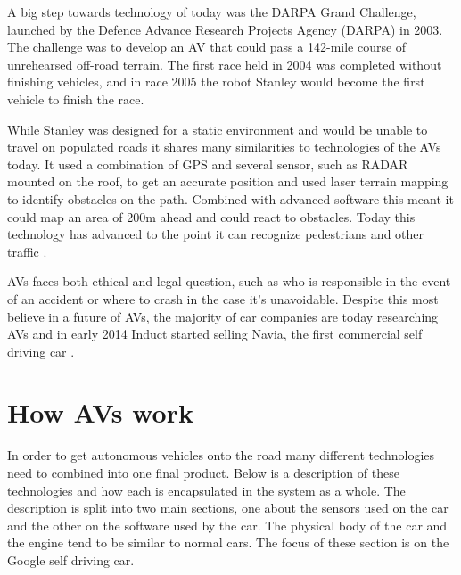 \documentclass[11pt]{article}
\begin{document}
A big step towards technology of today was the DARPA Grand Challenge, launched by the Defence Advance Research Projects Agency (DARPA) in 2003. The challenge was to develop an AV that could pass a 142-mile course of unrehearsed off-road terrain. The first race held in 2004 was completed without finishing vehicles, and in race 2005 the robot Stanley would become the first vehicle to finish the race.

While Stanley was designed for a static environment and would be unable to travel on populated roads it shares many similarities to technologies of the AVs today. It used a combination of GPS and several sensor, such as RADAR mounted on the roof, to get an accurate position and used laser terrain mapping to identify obstacles on the path. Combined with advanced software this meant it could map an area of 200m ahead and could react to obstacles. Today this technology has advanced to the point it can recognize pedestrians and other traffic \cite{Thrun2006stanley}.

AVs faces both ethical and legal question, such as who is responsible in the event of an accident or where to crash in the case it's unavoidable. Despite this most believe in a future of AVs, the majority of car companies are today researching AVs and in early 2014 Induct started selling Navia, the first commercial self driving car \cite{Maisto2014Navia}.


\section{How AVs work}
In order to get autonomous vehicles onto the road many different technologies need to combined into one final product. Below is a description of these technologies and how each is encapsulated in the system as a whole. The description is split into two main sections, one about the sensors used on the car and the other on the software used by the car. The physical body of the car and the engine tend to be similar to normal cars. The focus of these section is on the Google self driving car. 
\end{document}

